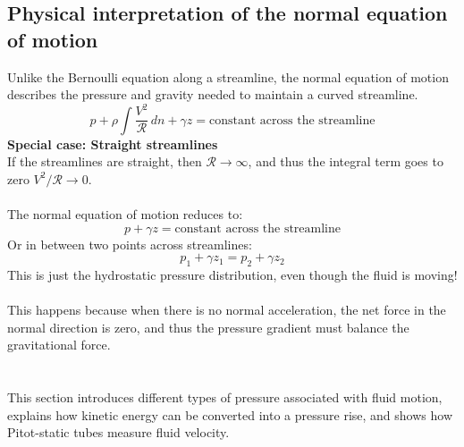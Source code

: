 ﻿\documentclass[12pt]{article}
\begin{document}
\subsection*{Physical interpretation of the normal equation of motion}
Unlike the Bernoulli equation along a streamline, the normal equation of motion describes the pressure and gravity needed to maintain a curved streamline. 
\[p+\rho\int\frac{V^2}{\mathscr{R}}\,dn+\gamma z =\text{constant across the streamline}\]
\textbf{Special case: Straight streamlines}\\
If the streamlines are straight, then $\mathscr{R} \to \infty$, and thus the integral term goes to zero $V^2/\mathscr{R} \to 0$.\\\\
The normal equation of motion reduces to:
\[p+\gamma z = \text{constant across the streamline}\] 
Or in between two points across streamlines:
\[p_1 + \gamma z_1 = p_2 + \gamma z_2\]
This is just the hydrostatic pressure distribution, even though the fluid is moving!\\\\
This happens because when there is no normal acceleration, the net force in the normal direction is zero, and thus the pressure gradient must balance the gravitational force.
\section*{}
This section introduces different types of pressure associated with fluid motion, explains how kinetic energy can be converted into a pressure rise, and shows how Pitot-static tubes measure fluid velocity.
\end{document}
